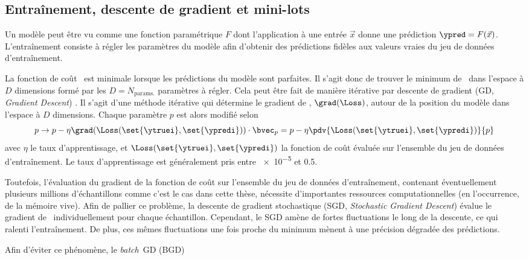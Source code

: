 \subsection{Entraînement, descente de gradient et mini-lots}\label{chapter-ML-section-gradient_descent}
Un modèle peut être vu comme une fonction paramétrique $F$
dont l'application à une entrée $\vec{x}$
donne une prédiction $\ypred=F(\vec{x})$.
L'entraînement consiste à régler les paramètres du modèle
afin d'obtenir des prédictions fidèles aux valeurs vraies du jeu de données d'entraînement.
\par
La fonction de coût \Loss\ est minimale lorsque les prédictions du modèle sont parfaites.
Il s'agit donc de trouver le minimum de \Loss\ dans l'espace à $D$ dimensions formé par les $D=N_\text{params.}$ paramètres à régler.
Cela peut être fait de manière itérative par descente de gradient (GD, \emph{Gradient Descent}) \cite{cauchy_1847}.
Il s'agit d'une méthode itérative qui détermine le gradient de \Loss, $\grad(\Loss)$, autour de la \og position \fg{} du modèle dans l'espace à $D$ dimensions.
Chaque paramètre $p$ est alors modifié selon
\begin{equation}
p \to p - \eta \grad(\Loss(\set{\ytruei}, \set{\ypredi})) \cdot \bvec_p = p - \eta \pdv{\Loss(\set{\ytruei}, \set{\ypredi})}{p}
\end{equation}
avec $\eta$ le taux d'apprentissage,
et
$\Loss(\set{\ytruei}, \set{\ypredi})$
la fonction de coût évaluée sur l'ensemble du jeu de données d'entraînement.
Le taux d'apprentissage est généralement pris entre \num{e-5} et \num{0.5}.
\par
Toutefois, l'évaluation du gradient de la fonction de coût sur l'ensemble du jeu de données d'entraînement,
contenant éventuellement plusieurs millions d'échantillons comme c'est le cas dans cette thèse,
nécessite d'importantes ressources computationnelles (en l'occurrence, de la mémoire vive).
Afin de pallier ce problème,
la descente de gradient stochastique (SGD, \emph{Stochastic Gradient Descent})
évalue le gradient de \Loss\ individuellement pour chaque échantillon.
Cependant, le SGD amène de fortes fluctuations le long de la descente,
ce qui ralenti l'entraînement.
De plus, ces mêmes fluctuations une fois proche du minimum mènent à une précision dégradée des prédictions.
\par
Afin d'éviter ce phénomène,
le \emph{batch}~GD (BGD) \cite{SGD}
